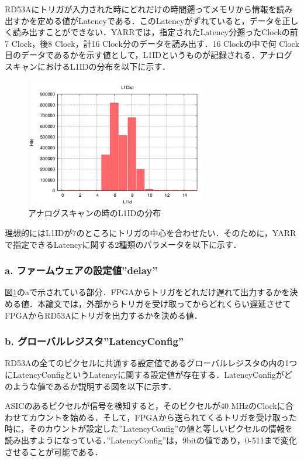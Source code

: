 RD53Aにトリガが入力された時にどれだけの時間遡ってメモリから情報を読み出すかを定める値がLatencyである．このLatencyがずれていると，データを正しく読み出すことができない．YARRでは，指定されたLatency分遡ったClockの前7 $\mathrm{Clock}$，後8 $\mathrm{Clock}$，計16 $\mathrm{Clock}$分のデータを読み出す．16 $\mathrm{Clock}$の中で何 $\mathrm{Clock}$目のデータであるかを示す値として，L1IDというものが記録される．アナログスキャンにおけるL1IDの分布を以下に示す．\par
\begin{figure}[h]
  \centering
  \includegraphics[width=8cm]{./figure/l1dist.png}
  \caption{アナログスキャンの時のL1IDの分布}
  \label{fig:YARRDAQ}
\end{figure}

理想的にはL1IDが7のところにトリガの中心を合わせたい．そのために，YARRで指定できるLatencyに関する2種類のパラメータを以下に示す．

%

\subsubsection*{a. ファームウェアの設定値''delay''}
図\ref{fig:YARRDAQ}のaで示されている部分．FPGAからトリガをどれだけ遅れて出力するかを決める値．本論文では，外部からトリガを受け取ってからどれくらい遅延させてFPGAからRD53Aにトリガを出力するかを決める値．

\subsubsection*{b. グローバルレジスタ''LatencyConfig''}
RD53Aの全てのピクセルに共通する設定値であるグローバルレジスタの内の1つにLatencyConfigというLatencyに関する設定値が存在する．LatencyConfigがどのような値であるか説明する図を以下に示す．\par
ASICのあるピクセルが信号を検知すると，そのピクセルが40 $\mathrm{MHz}$のClockに合わせてカウントを始める．そして，FPGAから送られてくるトリガを受け取った時に，そのカウントが設定した''LatencyConfig''の値と等しいピクセルの情報を読み出すようになっている．''LatencyConfig''は，9bitの値であり，0-511まで変化させることが可能である．

